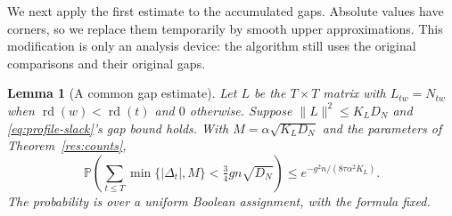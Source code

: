 \documentclass[11pt,a4paper]{article}
\newtheorem{lemma}[theorem]{Lemma}
\theoremstyle{definition}
\theoremstyle{remark}
\newcommand{\Prb}{\mathbb P}
\begin{document}
We next apply the first estimate to the accumulated gaps. Absolute values
have corners, so we replace them temporarily by smooth upper approximations.
This modification is only an analysis device: the algorithm still uses
the original comparisons and their original gaps.

\begin{lemma}[A common gap estimate]\label{lem:counts-profile}
Let $L$ be the $T\times T$ matrix with $L_{tw}=N_{tw}$ when
$\operatorname{rd}(w)<\operatorname{rd}(t)$ and $0$ otherwise. Suppose $\|L\|^2\le K_LD_N$ and
\eqref{eq:profile-slack}'s gap bound holds. With
$M=\alpha\sqrt{K_LD_N}$ and the parameters of Theorem~\ref{res:counts},
\[
 \Prb\left(\sum_{t\le T}\min\{|\Delta_t|,M\}
               <\tfrac34gn\sqrt{D_N}\right)
 \le e^{-g^2n/(8\tau\alpha^2K_L)}.
\]
The probability is over a uniform Boolean assignment, with the formula fixed.
\end{lemma}
\end{document}
